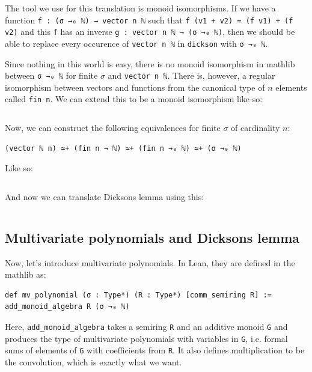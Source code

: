 \documentclass[a4paper, 12pt]{article}
\newcommand{\lean}[1]{\texttt{#1}}
\theoremstyle{changedot}
\theoremstyle{changedotbreak}
\theoremstyle{nonumberplain}
\begin{document}
The tool we use for this translation is monoid isomorphisms. If we have a function \lean{f : (σ →₀ ℕ) → vector n ℕ} such that \lean{f (v1 + v2) = (f v1) + (f v2)} and this \lean{f} has an inverse \lean{g : vector n ℕ → (σ →₀ ℕ)}, then we should be able to replace every occurence of \lean{vector n ℕ} in \lean{dickson} with \lean{σ →₀ ℕ}.

Since nothing in this world is easy, there is no monoid isomorphism in mathlib between \lean{σ →₀ ℕ} for finite $\sigma$ and \lean{vector n ℕ}. There is, however, a regular isomorphism between vectors and functions from the canonical type of $n$ elements called \lean{fin n}. We can extend this to be a monoid isomorphism like so:

\inputminted[firstline=21, lastline=29]{lean}{../src/dickson_add_monoid.lean}

Now, we can construct the following equivalences for finite $\sigma$ of cardinality $n$:

\begin{verbatim}
(vector ℕ n) ≃+ (fin n → ℕ) ≃+ (fin n →₀ ℕ) ≃+ (σ →₀ ℕ)
\end{verbatim}

Like so:

\inputminted[firstline=31, lastline=48]{lean}{../src/dickson_add_monoid.lean}

And now we can translate Dicksons lemma using this:

\inputminted[firstline=50]{lean}{../src/dickson_add_monoid.lean}



\subsection{Multivariate polynomials and Dicksons lemma}

Now, let's introduce multivariate polynomials. In Lean, they are defined in the mathlib as:

\begin{verbatim}
def mv_polynomial (σ : Type*) (R : Type*) [comm_semiring R] := add_monoid_algebra R (σ →₀ ℕ)
\end{verbatim}

Here, \lean{add_monoid_algebra} takes a semiring \lean{R} and an additive monoid \lean{G} and produces the type of multivariate polynomials with variables in \lean{G}, i.e. formal sums of elements of \lean{G} with coefficients from \lean{R}. It also defines multiplication to be the convolution, which is exactly what we want.
\end{document}

